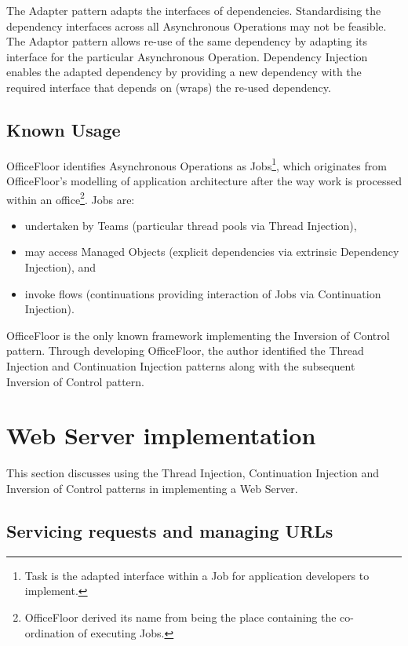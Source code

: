 \documentclass[prodmode]{style/acmlarge}
\begin{document}
The Adapter pattern \cite{gof} adapts the interfaces of dependencies.
Standardising the dependency interfaces across all Asynchronous Operations may
not be feasible.  The Adaptor pattern allows re-use of the same dependency by
adapting its interface for the particular Asynchronous Operation.  Dependency
Injection enables the adapted dependency by providing a new dependency with the
required interface that depends on (wraps) the re-used dependency.


\subsection{Known Usage}

OfficeFloor \cite{officefloor} identifies Asynchronous Operations as
Jobs\footnote{Task is the adapted interface within a Job for application
developers to implement.}, which originates from OfficeFloor's modelling of
application architecture after the way work is processed within an
office\footnote{OfficeFloor derived its name from being the place containing the
co-ordination of executing Jobs.}.  Jobs are:
\begin{itemize}
  \item undertaken by Teams (particular thread pools via Thread Injection),
  \item may access Managed Objects (explicit dependencies via extrinsic Dependency Injection), and
  \item invoke flows (continuations providing interaction of Jobs via Continuation Injection).
\end{itemize}

OfficeFloor is the only known framework implementing the Inversion of Control
pattern.  Through developing OfficeFloor, the author identified the Thread
Injection and Continuation Injection patterns along with the subsequent
Inversion of Control pattern.



\section{Web Server implementation}

This section discusses using the Thread Injection, Continuation Injection and
Inversion of Control patterns in implementing a Web Server.


\subsection{Servicing requests and managing URLs}
\end{document}
